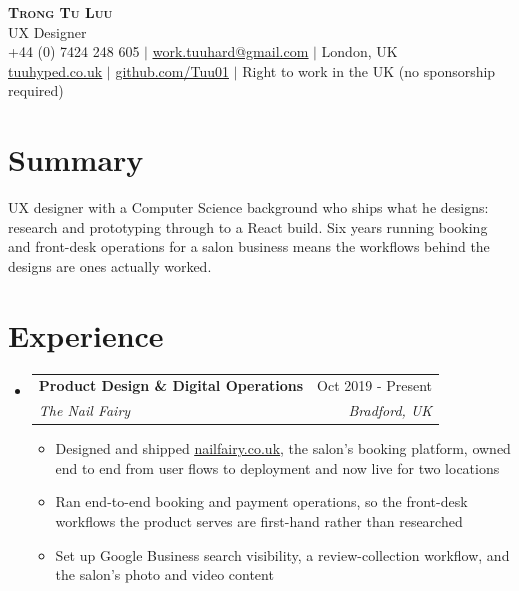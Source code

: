 \documentclass[letterpaper,11pt]{article}
\makeatletter
\newcommand{\resumeItem}[1]{
  \item\small{
    {#1 \vspace{-2pt}}
  }
}
\newcommand{\resumeSubheading}[4]{
  \vspace{-2pt}\item
    \begin{tabular*}{0.97\textwidth}[t]{l@{\extracolsep{\fill}}r}
      \textbf{#1} & #2 \\
      \textit{\small#3} & \textit{\small #4} \\
    \end{tabular*}\vspace{-7pt}
}
\newcommand{\resumeSubHeadingListStart}{\begin{itemize}[leftmargin=0.15in, label={}]}
\newcommand{\resumeSubHeadingListEnd}{\end{itemize}}
\newcommand{\resumeItemListStart}{\begin{itemize}}
\newcommand{\resumeItemListEnd}{\end{itemize}\vspace{-5pt}}
\makeatother
\begin{document}
\begin{center}
    \textbf{\Huge \scshape Trong Tu Luu} \\ \vspace{2pt}
    \small UX Designer \\ \vspace{2pt}
    \small +44 (0) 7424 248 605 $|$ \href{mailto:work.tuuhard@gmail.com}{\underline{work.tuuhard@gmail.com}} $|$ London, UK \\ \vspace{2pt}
    \small \href{https://www.tuuhyped.co.uk/}{\underline{tuuhyped.co.uk}} $|$ \href{https://github.com/Tuu01}{\underline{github.com/Tuu01}} $|$ Right to work in the UK (no sponsorship required)
\end{center}

\section{Summary}
\begin{itemize}[leftmargin=0.15in, label={}]
  \small{\item{
    UX designer with a Computer Science background who ships what he designs: research and
    prototyping through to a React build. Six years running booking and front-desk operations
    for a salon business means the workflows behind the designs are ones actually worked.
  }}
\end{itemize}

\section{Experience}
  \resumeSubHeadingListStart
    \resumeSubheading
      {Product Design \& Digital Operations}{Oct 2019 - Present}
      {The Nail Fairy}{Bradford, UK}
      \resumeItemListStart
        \resumeItem{Designed and shipped \href{https://nailfairy.co.uk/}{\underline{nailfairy.co.uk}}, the salon's booking platform, owned end to end from user flows to deployment and now live for two locations}
        \resumeItem{Ran end-to-end booking and payment operations, so the front-desk workflows the product serves are first-hand rather than researched}
        \resumeItem{Set up Google Business search visibility, a review-collection workflow, and the salon's photo and video content}
      \resumeItemListEnd
  \resumeSubHeadingListEnd

\end{document}
